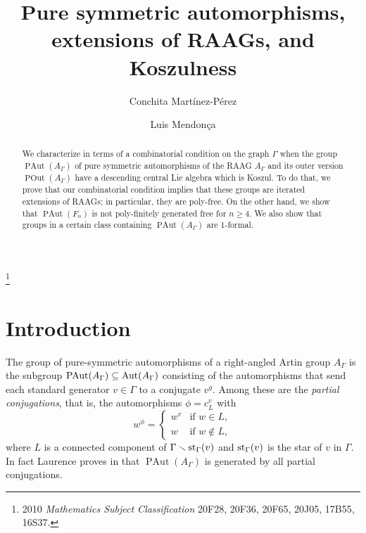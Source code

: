 \documentclass[10pt]{amsart}
\theoremstyle{definition}
\newcommand{\Aut}{{\rm Aut}}
\newcommand{\st}{{\rm st}}
\newcommand{\PAut}{\operatorname{PAut}}
\newcommand{\POut}{\operatorname {POut}}
\theoremstyle{definition}
\numberwithin{equation}{section}
\begin{document}
\title{Pure symmetric automorphisms, extensions of RAAGs, and Koszulness}


\author[C.~Mart\'inez-P\'erez]{Conchita Mart\'inez-P\'erez}
\address{Departamento de Matem\' aticas\\
        Universidad de Zaragoza\\
         50009 Zaragoza, Spain}

\author[L.~Mendon\c{c}a]{Luis Mendon\c{c}a}
\address{Instituto de Ci\^encias Exatas\\
        Universidade Federal de Minas Gerais\\
        31270-901 Belo Horizonte, Brazil}


\thanks{2010 {\em Mathematics Subject Classification} 20F28, 20F36, 20F65, 20J05, 17B55, 16S37.}

\begin{abstract}
We characterize in terms of a combinatorial condition on the graph $\Gamma$ when the group $\PAut(A_\Gamma)$ of pure symmetric automorphisms of the RAAG $A_\Gamma$ and its outer version $\POut(A_\Gamma)$  have a descending central Lie algebra which is Koszul. To do that, we prove that our combinatorial condition implies that these groups are iterated extensions of RAAGs; in particular, they are poly-free. On the other hand, we show that $\PAut(F_n)$ is not poly-finitely generated free for $n \geq 4$. We also show that groups in a certain class containing $\PAut(A_\Gamma)$ are 1-formal.
\end{abstract}


\maketitle

\section{Introduction}
The group of pure-symmetric automorphisms of a right-angled Artin group $A_\Gamma$ is the subgroup $\PAut(A_\Gamma) \subseteq \Aut(A_\Gamma)$ consisting of the automorphisms that send each standard generator $v \in \Gamma$ to a conjugate $v^g$. Among these are the \emph{partial conjugations}, that is, the automorphisms $\phi = c_L^v$ with
\[ w^\phi =
\begin{cases}
w^v & \text{if $w \in L$}, \\
w & \text{if $w \notin L$},
\end{cases}
\]
where $L$ is a connected component of $\Gamma \smallsetminus \st_\Gamma(v)$ and $\st_\Gamma(v)$ is the star of $v$ in $\Gamma$. In fact Laurence proves in \cite{Laurence} that $\PAut(A_\Gamma)$ is generated by all partial conjugations.
\end{document}
